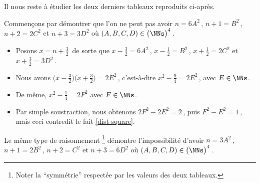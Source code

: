 \vspace{-1ex}
Il nous reste à étudier les deux derniers tableaux reproduits ci-après.

\begin{center}
\end{center}


Commençons par démontrer que l'on ne peut pas avoir 
$n = 6 A^2$\,, $n + 1 = B^2$\,, $n + 2 = 2 C^2$ et $n + 3 = 3 D^2$ 
où $(A, B, C, D) \in \big( \NNs \big)^4$\,.

\begin{itemize}
	\item Posons $x = n + \frac32$\, de sorte que 
	$x - \frac32 = 6 A^2$\,, $x - \frac12 = B^2$\,, $x + \frac12 = 2 C^2$ et $x + \frac32 = 3 D^2$\,.

	\item Nous avons
	$\big( x - \frac32 \big) \big( x + \frac32 \big) = 2 E^2$\,, c'est-à-dire $x^2 - \frac94 = 2 E^2$\,, avec $E \in \NNs$.

	\item De même,
	$x^2 - \frac14 = 2 F^2$ avec $F \in \NNs$.	

	\item Par simple soustraction, nous obtenons $2 F^2 - 2 E^2 = 2$\,, puis $F^2 - E^2 = 1$\,, mais ceci contredit le fait \ref{dist-square}.
\end{itemize}


Le même type de raisonnement
\footnote{
	Noter la \enquote{symmétrie} respectée par les valeurs des deux tableaux.
}
démontre l'impossibilité d'avoir 
$n = 3 A^2$\,, $n + 1 = 2 B^2$\,, $n + 2 = C^2$ et $n + 3 = 6 D^2$ 
où $(A, B, C, D) \in \big( \NNs \big)^4$\,.

